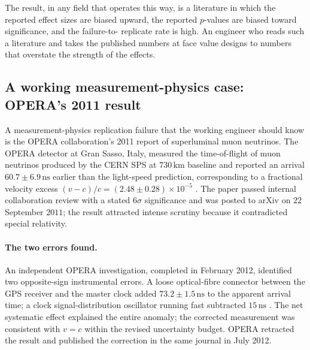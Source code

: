 The result, in any field that operates this way, is a literature in
which the reported effect sizes are biased upward, the reported
$p$-values are biased toward significance, and the failure-to-
replicate rate is high. An engineer who reads such a literature and
takes the published numbers at face value designs to numbers that
overstate the strength of the effects.

\subsection{A working measurement-physics case: OPERA's 2011 result}

A measurement-physics replication failure that the working
engineer should know is the OPERA collaboration's 2011 report
of superluminal muon neutrinos. The OPERA detector at Gran
Sasso, Italy, measured the time-of-flight of muon neutrinos
produced by the CERN SPS at $730\,\si{\kilo\meter}$ baseline and
reported an arrival $60.7 \pm 6.9 \,\si{\nano\second}$ earlier
than the light-speed prediction, corresponding to a fractional
velocity excess
$(v - c)/c = (2.48 \pm 0.28) \times 10^{-5}$
\cite{paper:ch08t3p-opera-2011}. The paper passed internal
collaboration review with a stated $6\sigma$ significance and
was posted to arXiv on $22$ September $2011$; the result
attracted intense scrutiny because it contradicted special
relativity.

\paragraph{The two errors found.} An independent OPERA
investigation, completed in February 2012, identified two
opposite-sign instrumental errors. A loose optical-fibre
connector between the GPS receiver and the master clock added
$73.2 \pm 1.5\,\si{\nano\second}$ to the apparent arrival time;
a clock signal-distribution oscillator running fast subtracted
$15\,\si{\nano\second}$ \cite{paper:ch08t3p-opera-2012}. The
net systematic effect explained the entire anomaly; the
corrected measurement was consistent with $v = c$ within the
revised uncertainty budget. OPERA retracted the result and
published the correction in the same journal in July 2012.

